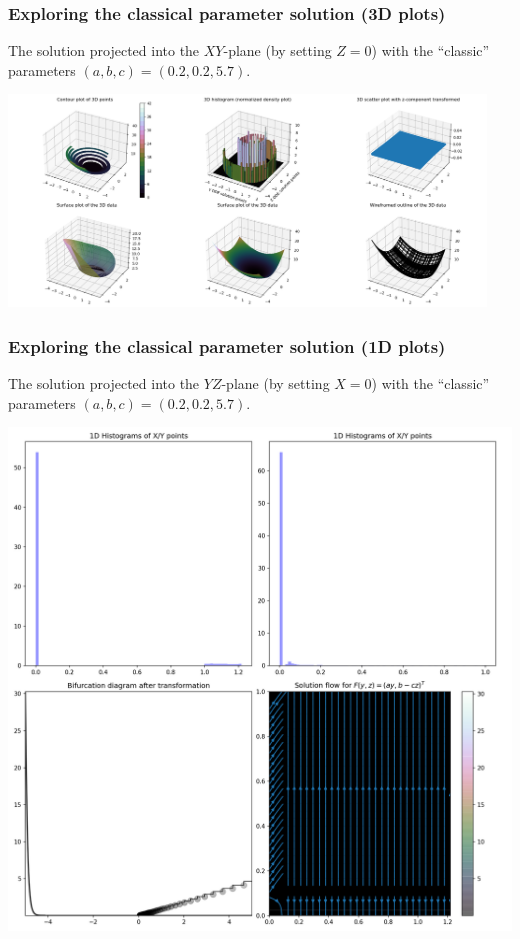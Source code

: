 \documentclass[usenames,svgnames,dvipsnames,10pt]{beamer}
\begin{document}
\begin{frame}[fragile]
\frametitle{Exploring the classical parameter solution (3D plots)}

The solution projected into the $XY$-plane (by setting $Z=0$) with the ``classic'' 
parameters $(a, b, c) = (0.2, 0.2, 5.7)$. \\ 
\begin{center}
\includegraphics[width=0.95\textwidth]{../Images/RosslerAttractorSummary-TypeXY-Plot3D-A0-200B0-200C5-700-2021-10-27-044740.png}
\end{center}

\end{frame}

\begin{frame}[fragile]
\frametitle{Exploring the classical parameter solution (1D plots)}

The solution projected into the $YZ$-plane (by setting $X=0$) with the ``classic'' 
parameters $(a, b, c) = (0.2, 0.2, 5.7)$. \\ 
\begin{center}
\includegraphics[height=0.75\textheight]{../Images/RosslerAttractorSummary-TypeYZ-Plot1D-A0-200B0-200C5-700-2021-10-27-045009.png}
\end{center}

\end{frame}
\end{document}

